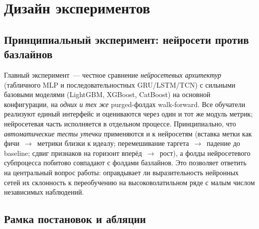 \documentclass[12pt,a4paper]{report}
\begin{document}
\chapter{Дизайн экспериментов}
\label{ch:design}

\section{Принципиальный эксперимент: нейросети против базлайнов}

Главный эксперимент~--- честное сравнение \emph{нейросетевых архитектур}
(табличного MLP и последовательностных GRU/LSTM/TCN) с сильными базовыми моделями
(LightGBM, XGBoost, CatBoost) на основной конфигурации, на \emph{одних и тех же}
purged-фолдах walk-forward. Все обучатели реализуют единый интерфейс и оцениваются
через один и тот же модуль метрик; нейросетевая часть исполняется в отдельном
процессе. Принципиально, что \emph{автоматические тесты утечки} применяются и к
нейросетям (вставка метки как фичи~$\to$~метрики близки к идеалу; перемешивание
таргета~$\to$~падение до baseline; сдвиг признаков на горизонт вперёд~$\to$~рост),
а фолды нейросетевого субпроцесса побитово совпадают с фолдами базлайнов. Это
позволяет ответить на центральный вопрос работы: оправдывает ли выразительность
нейронных сетей их склонность к переобучению на высоковолатильном ряде с малым
числом независимых наблюдений.

\section{Рамка постановок и абляции}
\end{document}
